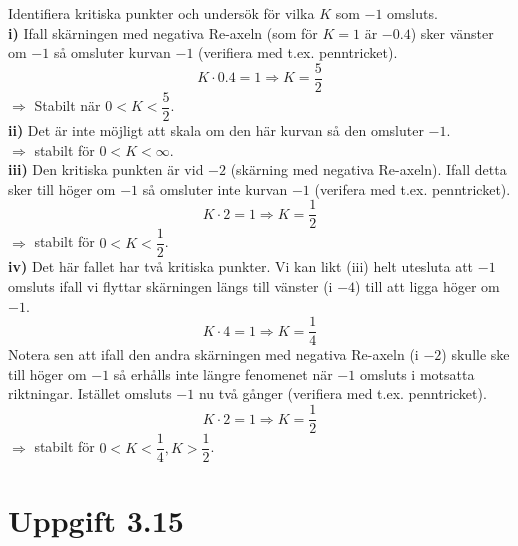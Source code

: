 \documentclass[12pt]{article}
\begin{document}
Identifiera kritiska punkter och undersök för vilka $K$ som $-1$ omsluts. \\

\textbf{i)} Ifall skärningen med negativa Re-axeln (som för $K = 1$ är $-0.4$) sker vänster om $-1$ så omsluter kurvan $-1$ (verifiera med t.ex. penntricket). 
\[K\cdot 0.4 = 1 \Rightarrow K = \frac{5}{2}\]
$\Rightarrow$ Stabilt när $0 < K < \dfrac{5}{2}$.\\

\textbf{ii)} Det är inte möjligt att skala om den här kurvan så den omsluter $-1$. \\
$\Rightarrow$ stabilt för $0 < K < \infty$. \\

\textbf{iii)} Den kritiska punkten är vid $-2$ (skärning med negativa Re-axeln). Ifall detta sker till höger om $-1$ så omsluter inte kurvan $-1$ (verifera med t.ex. penntricket).
\[K\cdot 2 = 1 \Rightarrow K = \frac{1}{2}\]
$\Rightarrow$ stabilt för $0 < K < \dfrac{1}{2}$. \\

\textbf{iv)} Det här fallet har två kritiska punkter. Vi kan likt (iii) helt utesluta att $-1$ omsluts ifall vi flyttar skärningen längs till vänster (i $-4$) till att ligga höger om $-1$.
\[K \cdot 4 = 1 \Rightarrow K = \frac{1}{4}\]
Notera sen att ifall den andra skärningen med negativa Re-axeln (i $-2$) skulle ske till höger om $-1$ så erhålls inte längre fenomenet när $-1$ omsluts i motsatta riktningar. Istället omsluts $-1$ nu två gånger (verifiera med t.ex. penntricket).
\[K \cdot 2 = 1 \Rightarrow K = \frac{1}{2}\]
$\Rightarrow$ stabilt för $0 < K < \dfrac{1}{4}, K > \dfrac{1}{2}$.

\section*{Uppgift 3.15}
\end{document}
